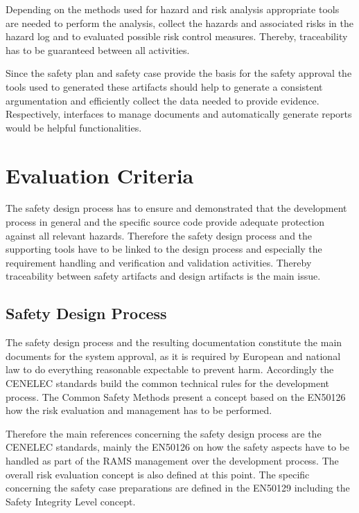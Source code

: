 \documentclass{template/openetcs_article}
\begin{document}
Depending on the methods used for hazard and risk analysis appropriate tools are needed to perform the analysis, collect the hazards and associated risks in the hazard log and to evaluated possible risk control measures. Thereby, traceability has to be guaranteed between all activities.

Since the safety plan and safety case provide the basis for the safety approval the tools used to generated these artifacts should help to generate a consistent argumentation and efficiently collect the data needed to provide evidence. Respectively, interfaces to manage documents and automatically generate reports would be helpful functionalities.

\newpage

\section{Evaluation Criteria}

The safety design process has to ensure and demonstrated that the development process in general and the specific source code provide adequate protection against all relevant hazards. Therefore the safety design process and the supporting tools have to be linked to the design process and especially the requirement handling and verification and validation activities. Thereby traceability between safety artifacts and design artifacts is the main issue.

\subsection{Safety Design Process}

The safety design process and the resulting documentation constitute the main documents for the system approval, as it is required by European and national law to do everything reasonable expectable to prevent harm. Accordingly the CENELEC standards build the common technical rules for the development process. The Common Safety Methods present a concept based on the EN50126 how the risk evaluation and management has to be performed. 

Therefore the main references concerning the safety design process are the CENELEC standards, mainly the EN50126 on how the safety aspects have to be handled as part of the RAMS management over the development process. The overall risk evaluation concept is also defined at this point. The specific concerning the safety case preparations are defined in the EN50129 including the Safety Integrity Level concept. 
\end{document}
